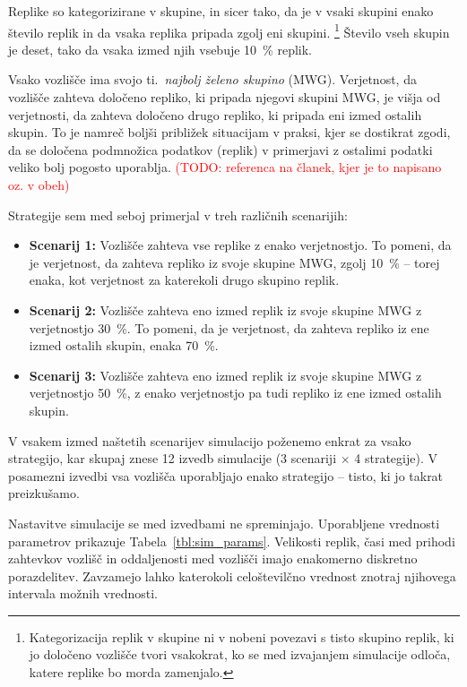\documentclass[a4paper, 12pt]{book}
\newcommand{\TODO}[1]{\textcolor{red}{(TODO: #1)}}
\begin{document}
Replike so kategorizirane v skupine, in sicer tako, da je v vsaki skupini
enako število replik in da vsaka replika pripada zgolj eni skupini.%
\footnote{Kategorizacija replik v skupine ni v nobeni povezavi s tisto skupino
replik, ki jo določeno vozlišče tvori vsakokrat, ko se med izvajanjem
simulacije odloča, katere replike bo morda zamenjalo.}
Število vseh skupin je deset, tako da vsaka izmed njih vsebuje 10~\% replik.

Vsako vozlišče ima svojo ti.~\textit{najbolj želeno skupino} (MWG). Verjetnost,
da vozlišče zahteva določeno repliko, ki pripada njegovi skupini MWG, je višja
od verjetnosti, da zahteva določeno drugo repliko, ki pripada eni izmed
ostalih skupin. To je namreč boljši približek situacijam v praksi,
kjer se dostikrat zgodi, da se določena podmnožica podatkov (replik) v
primerjavi z ostalimi podatki veliko bolj pogosto uporablja.
\TODO{referenca na članek, kjer je to napisano oz. v obeh}

Strategije sem med seboj primerjal v treh različnih scenarijih:
\begin{itemize}
  \item \textbf{Scenarij 1:} Vozlišče zahteva vse replike z
    enako verjetnostjo. To pomeni, da je verjetnost, da zahteva repliko iz
    svoje skupine MWG, zgolj 10~\% -- torej enaka, kot verjetnost za
    katerekoli drugo skupino replik.

  \item \textbf{Scenarij 2:} Vozlišče zahteva eno izmed replik iz svoje
    skupine MWG z verjetnostjo 30~\%. To pomeni, da je verjetnost, da
    zahteva repliko iz ene izmed ostalih skupin, enaka 70~\%.

  \item \textbf{Scenarij 3:} Vozlišče zahteva eno izmed replik iz svoje
    skupine MWG z verjetnostjo 50~\%, z enako verjetnostjo pa tudi repliko
    iz ene izmed ostalih skupin.
\end{itemize}
V vsakem izmed naštetih scenarijev simulacijo poženemo enkrat za vsako
strategijo, kar skupaj znese 12 izvedb simulacije
(3 scenariji $\times$ 4 strategije). V posamezni izvedbi vsa vozlišča
uporabljajo enako strategijo -- tisto, ki jo takrat preizkušamo.

Nastavitve simulacije se med izvedbami ne spreminjajo. Uporabljene vrednosti
parametrov prikazuje Tabela~\ref{tbl:sim_params}.
Velikosti replik, časi med prihodi zahtevkov vozlišč in oddaljenosti med
vozlišči imajo enakomerno diskretno porazdelitev. Zavzamejo lahko katerokoli
celoštevilčno vrednost znotraj njihovega intervala možnih vrednosti.
\end{document}
